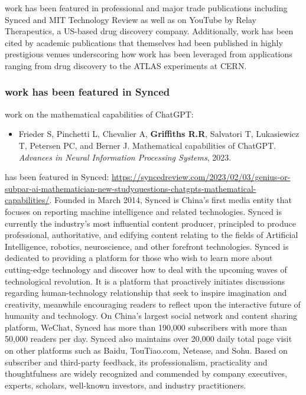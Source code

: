 \documentclass[11pt]{article}
\begin{document}
\drs work has been featured in professional and major trade publications including Synced and MIT Technology Review as well as on YouTube by Relay Therapeutics, a US-based drug discovery company. Additionally, \drs work has been cited by academic publications that themselves had been published in highly prestigious venues underscoring how \drs work has been leveraged from applications ranging from drug discovery to the ATLAS experiments at CERN.

\subsubsection{\drs work has been featured in Synced}
\label{synced}

\drs work on the mathematical capabilities of ChatGPT:

\begin{itemize}
\item Frieder S, Pinchetti L, Chevalier A, \textbf{Griffiths R.R}, Salvatori T, Lukasiewicz T, Petersen PC, and Berner J. Mathematical capabilities of ChatGPT. \textit{Advances in Neural Information Processing Systems}, 2023.
\end{itemize}

has been featured in Synced: \url{https://syncedreview.com/2023/02/03/genius-or-subpar-ai-mathematician-new-studyquestions-chatgpts-mathematical-capabilities/}. Founded in March 2014, Synced is China’s first media entity that focuses on reporting machine intelligence and related technologies. Synced is currently the industry’s most influential content producer, principled to produce professional, authoritative, and edifying content relating to the fields of Artificial Intelligence, robotics, neuroscience, and other forefront technologies. Synced is dedicated to providing a platform for those who wish to learn more about cutting-edge technology and discover how to deal with the upcoming waves of technological revolution. It is a platform that proactively initiates discussions regarding human-technology relationship that seek to inspire imagination and creativity, meanwhile encouraging readers to reflect upon the interactive future of humanity and technology. On China’s largest social network and content sharing platform, WeChat, Synced has more than 190,000 subscribers with more than 50,000 readers per day. Synced also maintains over 20,000 daily total page visit on other platforms such as Baidu, TouTiao.com, Netease, and Sohu. Based on subscriber and third-party feedback, its professionalism, practicality and thoughtfulness are widely recognized and commended by company executives, experts, scholars, well-known investors, and industry practitioners. \\
\end{document}
